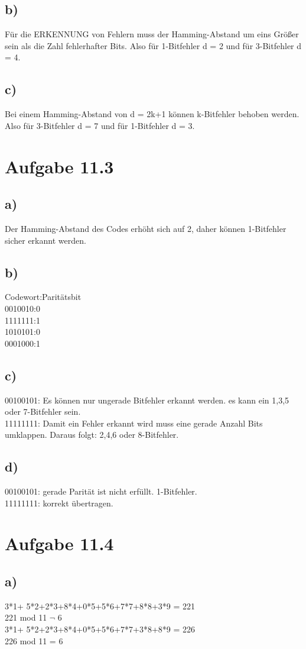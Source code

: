 \documentclass{article}
\begin{document}
	\subsection*{b)}
	Für die ERKENNUNG von Fehlern muss der Hamming-Abstand um eins Größer sein als die Zahl fehlerhafter Bits. Also für 1-Bitfehler d = 2 und für 3-Bitfehler d = 4.
	\subsection*{c)}
	Bei einem Hamming-Abstand von d = 2k+1 können k-Bitfehler behoben werden. Also für 3-Bitfehler d = 7 und für 1-Bitfehler d = 3.
	
	\section*{Aufgabe 11.3}
	\subsection*{a)}
	Der Hamming-Abstand des Codes erhöht sich auf 2, daher können 1-Bitfehler sicher erkannt werden.
	\subsection*{b)}
	Codewort:Paritätsbit \\
	0010010:0 \\
	1111111:1 \\
	1010101:0 \\
	0001000:1
	\subsection*{c)}
	00100101: Es können nur ungerade Bitfehler erkannt werden. es kann ein 1,3,5 oder 7-Bitfehler sein. \\
	11111111: Damit ein Fehler erkannt wird muss eine gerade Anzahl Bits umklappen. Daraus folgt: 2,4,6 oder 8-Bitfehler.
	\subsection*{d)}
	00100101: gerade Parität ist nicht erfüllt. 1-Bitfehler. \\
	11111111: korrekt übertragen. 
	\section*{Aufgabe 11.4}
	\subsection*{a)}
	3*1+ 5*2+2*3+8*4+0*5+5*6+7*7+8*8+3*9 = 221 \\
	221 mod 11 $\neg$ 6 \\
	3*1+ 5*2+2*3+8*4+0*5+5*6+7*7+3*8+8*9 = 226 \\
	226 mod 11 = 6
\end{document}
